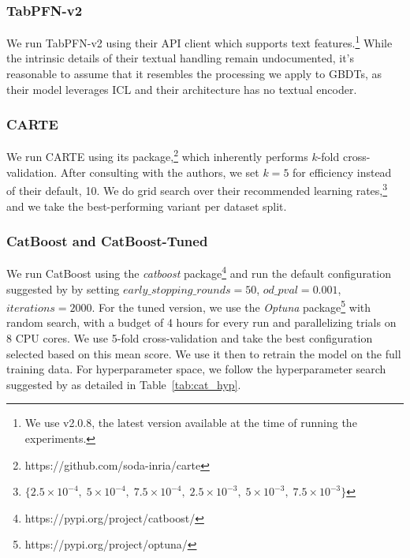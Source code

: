 \subsubsection{TabPFN-v2}

We run TabPFN-v2 using their API client which supports text features.\footnote{We use v2.0.8, the latest version available at the time of running the experiments.} While the intrinsic details of their textual handling remain undocumented, it's reasonable to assume that it resembles the processing we apply to GBDTs, as their model leverages ICL and their architecture has no textual encoder.

\subsubsection{CARTE}

We run CARTE using its package,\footnote{https://github.com/soda-inria/carte} which inherently performs $k$-fold cross-validation. After consulting with the authors, we set $k=5$ for efficiency instead of their default, 10. We do grid search over their recommended learning rates,\footnote{$\{2.5\times10^{-4},\;5\times10^{-4},\;7.5\times10^{-4},\;2.5\times10^{-3},\;5\times10^{-3},\;7.5\times10^{-3}\}$
} and we take the best-performing variant per dataset split.

\subsubsection{CatBoost and CatBoost-Tuned}

We run CatBoost using the \textit{catboost} package\footnote{https://pypi.org/project/catboost/} and run the default configuration suggested by \cite{gorishniy_revisiting_2021} by setting $early\_stopping\_rounds=50$, $od\_pval=0.001$, $iterations = 2000$. For the tuned version, we use the \textit{Optuna} package\footnote{https://pypi.org/project/optuna/} with random search, with a budget of 4 hours for every run and parallelizing trials on 8 CPU cores. We use 5-fold cross-validation and take the best configuration selected based on this mean score. We use it then to retrain the model on the full training data. For hyperparameter space, we follow the hyperparameter search suggested by \cite{hollmann_accurate_2025} as detailed in Table~\ref{tab:cat_hyp}.


